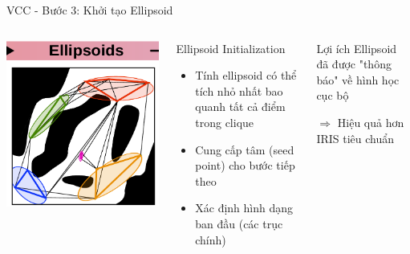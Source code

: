 \documentclass[aspectratio=169]{beamer}
\begin{document}
\begin{frame}{VCC - Bước 3: Khởi tạo Ellipsoid}
    \begin{columns}[c]
        \centering
        \includegraphics[width=\textwidth]{../imgs/VCC-3.png}

        \begin{block}{Ellipsoid Initialization}
            \small
            \begin{itemize}
                \item Tính ellipsoid có thể tích nhỏ nhất bao quanh tất cả điểm trong clique
                \item Cung cấp tâm (seed point) cho bước tiếp theo
                \item Xác định hình dạng ban đầu (các trục chính)
            \end{itemize}
        \end{block}

        \begin{alertblock}{Lợi ích}
            \small
            Ellipsoid đã được "thông báo" về hình học cục bộ
            
            \vspace{0.2cm}
            $\Rightarrow$ Hiệu quả hơn IRIS tiêu chuẩn
        \end{alertblock}
    \end{columns}
\end{frame}
\end{document}
